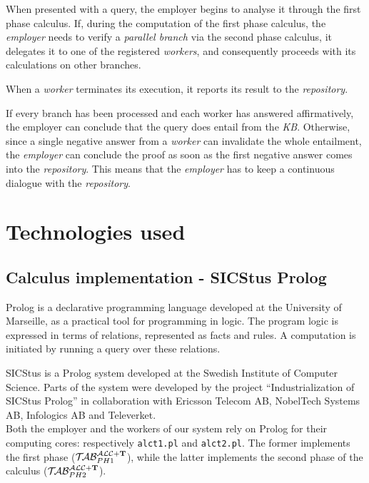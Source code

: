 \documentclass[a4paper, 11pt, oneside]{duthesis}
\newcommand{\tip}{{\bf T}}
\newcommand{\primo}{\mathrel{{\mathcal{T}\!\mathcal{AB}}}_{PH 1}^{\mathcal{ALC}+\mbox{\scriptsize $\tip$}}}
\newcommand{\secondo}{\mathrel{{\mathcal{T}\!\mathcal{AB}}}_{PH 2}^{\mathcal{ALC}+\mbox{\scriptsize $\tip$}}}
\begin{document}
When presented with a query, the employer begins to analyse it through the first phase calculus.
If, during the computation of the first phase calculus, the \emph{employer} needs to verify a \emph{parallel branch} via the second phase calculus, it delegates it to one of the registered \emph{workers}, and consequently proceeds with its calculations on other branches.

When a \emph{worker} terminates its execution, it reports its result to the \emph{repository}.

If every branch has been processed and each worker has answered affirmatively, the employer can conclude that the query does entail from the \emph{KB}.
Otherwise, since a single negative answer from a \emph{worker} can invalidate the whole entailment, the \emph{employer} can conclude the proof as soon as the first negative answer comes into the \emph{repository}.
This means that the \emph{employer} has to keep a continuous dialogue with the \emph{repository}.

\newpage

\section{Technologies used}


\subsection{Calculus implementation - SICStus Prolog}

Prolog is a declarative programming language developed at the University of Marseille, as a practical tool for programming in logic. The program logic is expressed in terms of relations, represented as facts and rules. A computation is initiated by running a query over these relations\cite{Lloyd:1984:FLP:2214}.

SICStus is a Prolog system developed at the Swedish Institute of Computer Science. Parts of the system were developed by the project “Industrialization of SICStus Prolog” in collaboration with Ericsson Telecom AB, NobelTech Systems AB, Infologics AB and Televerket\cite{sicstus_intro}.\\

Both the employer and the workers of our system rely on Prolog for their computing cores: respectively \verb$alct1.pl$ and \verb$alct2.pl$. The former implements the first phase ($\primo$), while the latter implements the second phase of the calculus ($\secondo$).
\end{document}
